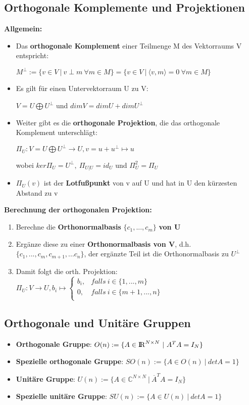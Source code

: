 \documentclass[10pt,a4paper]{article}
\def\realnumbers{{\rm I\!R}}
\def\complexnumbers{{\mathbb{C}}}
\begin{document}
	\subsection{Orthogonale Komplemente und Projektionen}
	\textbf{Allgemein:}
	\begin{itemize}
		\item Das \textbf{orthogonale Komplement} einer Teilmenge M des Vektorraums V entspricht:
		\begin{center}
			$M^\perp := \{v \in V\ |\ v\perp m\ \forall m\in M\} = \{v\in V\ |\ \langle v, m\rangle = 0\ \forall m\in M\}$
		\end{center}
		\item Es gilt für einen Untervektorraum U zu V:
		\begin{center}
			$V = U \bigoplus U^\perp$ und $dim V = dim U + dim U^\perp$
		\end{center}
		\item Weiter gibt es die \textbf{orthogonale Projektion}, die das orthogonale Komplement unterschlägt:
		\begin{center}
			$\Pi_U: V = U \bigoplus U^\perp \rightarrow U, v = u + u^\perp \mapsto u$
		\end{center}
		wobei $ker \Pi_U = U^\perp,\ \Pi_{U|U} = id_U$ und $\Pi^2_U = \Pi_U$
		\item $\Pi_U(v)$ ist der \textbf{Lotfußpunkt} von v auf U und hat in U den kürzesten Abstand zu v
	\end{itemize}
	\textbf{Berechnung der orthogonalen Projektion:}
	\begin{enumerate}
		\item Berechne die \textbf{Orthonormalbasis} $\{c_1, ..., c_m\}$ \textbf{von U}
		\item Ergänze diese zu einer \textbf{Orthonormalbasis von V}, d.h. $\{c_1, ..., c_m, c_{m + 1}, ... c_n\}$, der ergänzte Teil ist die Orthonormalbasis zu $U^\perp$
		\item Damit folgt die orth. Projektion: $\Pi_U: V \rightarrow U, b_i \mapsto
		\begin{cases}
			b_i,& falls\ i \in \{1, ..., m\}\\
			0,& falls\ i \in \{m + 1, ..., n\}\\
		\end{cases}$
	\end{enumerate}

	\subsection{Orthogonale und Unitäre Gruppen}
	\begin{itemize}
		\item \textbf{Orthogonale Gruppe}: $O(n) := \{A \in \realnumbers^{N\times N}\ |\ A^TA = I_N\}$
		\item \textbf{Spezielle orthogonale Gruppe}: $SO(n) := \{A \in O(n)\ |\ det A = 1\}$
		\item \textbf{Unitäre Gruppe}: $U(n) := \{A \in \complexnumbers^{N\times N}\ |\ \overline{A}^TA = I_N\}$
		\item \textbf{Spezielle unitäre Gruppe}: $SU(n) := \{A \in U(n)\ |\ det A = 1\}$
	\end{itemize}
\end{document}
